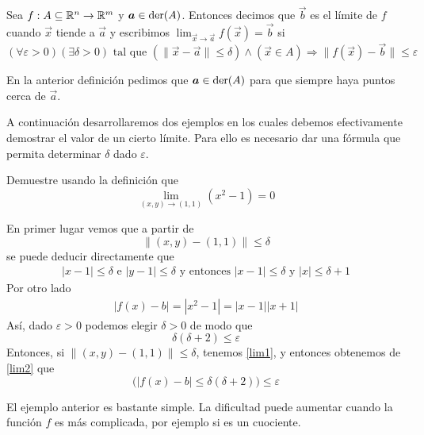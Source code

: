 \begin{definicion} Sea $f:A\subseteq\mathbb{R}^n\to\mathbb{R}^m$ y $\boldsymbol{a}\in \text{der}({A})$. Entonces
decimos que $\vec{b}$ es el l\'imite de $f$ cuando $\vec{x}$ tiende a $\vec{a}$ y escribimos
$\displaystyle \lim_{\vec{x}\to \vec{a}} f(\vec{x})=\vec{b}$ si
$$
(\forall\varepsilon>0)(\exists\delta>0)\text{ tal que }
(\|\vec{x}-\vec{a}\|\leq \delta)\wedge(\vec{x}\in A)\Rightarrow\|f(\vec{x})-\vec{b}\| \leq \varepsilon
$$ 
\end{definicion}

\begin{nota} 
En la anterior definici\'on pedimos que $\boldsymbol{a}\in \text{der}({A})$ para que siempre haya puntos cerca de $\vec{a}$. 
\end{nota}

A continuaci\'on desarrollaremos dos ejemplos en los cuales debemos efectivamente demostrar el valor de un cierto l\'imite. Para ello es necesario dar una f\'ormula que permita determinar $\delta$ dado $\varepsilon$.

\begin{ejemplo} 
Demuestre usando la definici\'on que
$$
\lim_{(x,y)\to (1,1)}(x^2-1)=0
$$
\begin{solucion}
En primer lugar vemos  que a partir de
$$
\|(x,y)-(1,1)\|\leq \delta
$$
se puede deducir directamente que 
\begin{gather}\label{lim1}
|x-1|\leq \delta \text{ e } |y-1|\leq \delta
\text{ y entonces } |x-1|\leq \delta \text{ y } |x|\leq \delta +1 \tag{*}
\end{gather}
Por otro lado 
\begin{gather}\label{lim2}
|f(x)-b|=|x^2-1|=|x-1||x+1| \tag{**}
\end{gather}
As\'i, dado $\varepsilon>0$ podemos elegir $\delta>0$ de modo que 
$$\delta(\delta +2)\leq \varepsilon$$
Entonces, si $\|(x,y)-(1,1)\|\leq \delta$, tenemos \eqref{lim1}, y entonces obtenemos de
\eqref{lim2} que 
$$
\big(|f(x)-b|\leq \delta(\delta+2)\big) \leq \varepsilon
$$
\end{solucion}
\end{ejemplo}

El ejemplo anterior es bastante simple. La dificultad puede aumentar
cuando la funci\'on $f$ es m\'as complicada, por ejemplo si es un
cuociente. 

